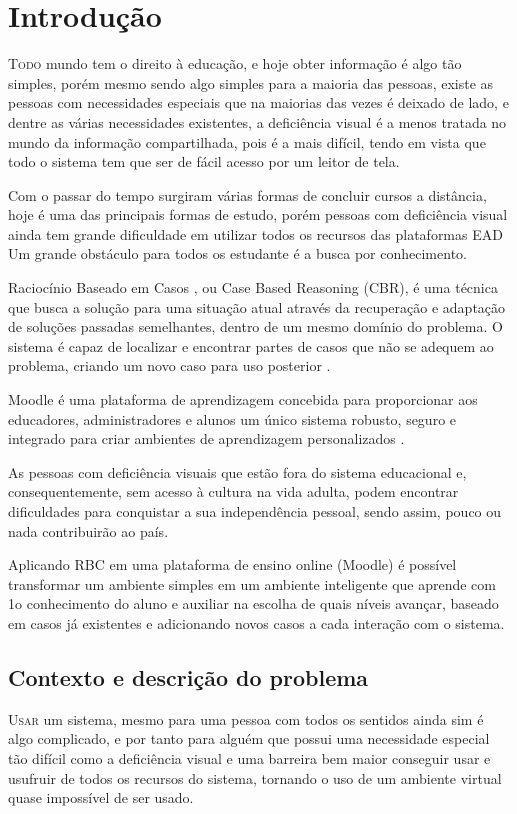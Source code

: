 \chapter{Introdução} \label{chap:Introdução}
\lettrine{T}{odo} mundo tem o direito à educação, e hoje obter informação é algo tão simples, porém mesmo sendo algo simples para a maioria das pessoas, existe as pessoas com necessidades especiais que na maiorias das vezes é deixado de lado, e dentre as várias necessidades existentes, a deficiência visual é a menos tratada no mundo da informação compartilhada, pois é a mais difícil, tendo em vista que todo o sistema tem que ser de fácil acesso por um leitor de tela.

Com o passar do tempo surgiram várias formas de concluir cursos a distância, hoje é uma das principais formas de estudo, porém pessoas com deficiência visual ainda tem grande dificuldade em utilizar todos os recursos das plataformas EAD Um grande obstáculo para todos os estudante é a busca por conhecimento.

Raciocínio Baseado em Casos , ou Case Based Reasoning (CBR), é uma técnica que busca a solução para uma situação atual através da recuperação e adaptação de soluções passadas semelhantes, dentro de um mesmo domínio do problema. O sistema é capaz de localizar e encontrar partes de casos que não se adequem ao problema, criando um novo caso para uso posterior \cite{Fernandes}. 

Moodle é uma plataforma de aprendizagem concebida para proporcionar aos educadores, administradores e alunos um único sistema robusto, seguro e integrado para criar ambientes de aprendizagem personalizados \cite{Moodle}.

As pessoas com deficiência visuais que estão fora do sistema educacional e, consequentemente, sem acesso à cultura na vida adulta, podem encontrar dificuldades para conquistar a sua independência pessoal, sendo assim, pouco ou nada contribuirão ao país.

Aplicando RBC em uma plataforma de ensino online (Moodle) é possível transformar um ambiente simples em um ambiente inteligente que aprende com 1o conhecimento do aluno e auxiliar na escolha de quais níveis avançar, baseado em casos já existentes e adicionando novos casos a cada interação com o sistema.

\section{Contexto e descrição do problema}
\lettrine{U}{sar} um sistema, mesmo para uma pessoa com todos os sentidos ainda sim é algo complicado, e por tanto para alguém que possui uma necessidade especial tão difícil como a deficiência visual e uma barreira bem maior conseguir usar e usufruir de todos os recursos do sistema, tornando o uso de um ambiente virtual quase impossível de ser usado.

